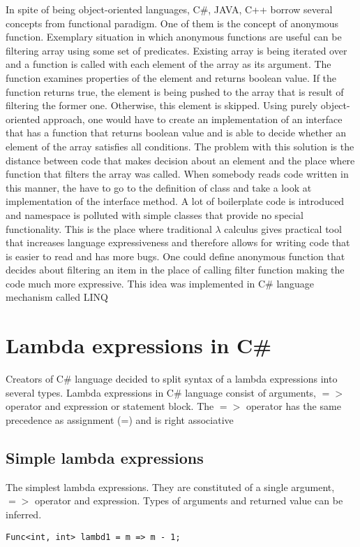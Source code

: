 \documentclass[]{report}
\begin{document}
    In spite of being object-oriented languages, C\#, JAVA, C++ borrow several concepts from functional paradigm. One of them is the concept of anonymous function. Exemplary situation in which anonymous functions are useful can be filtering array using some set of predicates. Existing array is being iterated over and a function is called with each element of the array as its argument. The function examines properties of the element and returns boolean value. If the function returns true, the element is being pushed to the array that is result of filtering the former one. Otherwise, this element is skipped. 
    Using purely object-oriented approach, one would have to create an implementation of an interface that has a function that returns boolean value and is able to decide whether an element of the array satisfies all conditions. The problem with this solution is the distance between code that makes decision about an element and the place where function that filters the array was called. When somebody reads code written in this manner, the have to go to the definition of class and take a look at implementation of the interface method. A lot of boilerplate code is introduced and namespace is polluted with simple classes that provide no special functionality.
    This is the place where traditional $\lambda$ calculus gives practical tool that increases language expressiveness and therefore allows for writing code that is easier to read and has more bugs. One could define anonymous function that decides about filtering an item in the place of calling filter function making the code much more expressive. This idea was implemented in C\# language mechanism called LINQ 
    
    \section{Lambda expressions in C\#}\label{lambdatypes}
    Creators of C\# language decided to split syntax of a lambda expressions into several types.
    Lambda expressions in C\# language consist of arguments, $=>$ operator and expression or statement block.
    The $=>$ operator has the same precedence as assignment (=) and is right associative \cite{csharplambdasyntax}
    
    \subsection{Simple lambda expressions}
    The simplest lambda expressions. They are constituted of a single argument, $=>$ operator and expression. Types of arguments and returned value can be inferred. 
    \begin{lstlisting}[style=sharpc, caption=This lambda has single integer argument m and returns an integer m - 1]
    Func<int, int> lambd1 = m => m - 1;
    \end{lstlisting}
\end{document}
